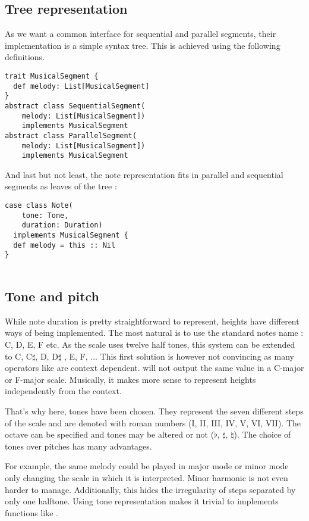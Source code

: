 \documentclass[twocolumn, 11pt]{article}
\begin{document}
\subsection{Tree representation}
As we want a common interface for sequential and parallel segments, their implementation is a simple syntax tree.
This is achieved using the following definitions.
\begin{lstlisting}
trait MusicalSegment {
  def melody: List[MusicalSegment]
}
abstract class SequentialSegment(
    melody: List[MusicalSegment])
    implements MusicalSegment
abstract class ParallelSegment(
    melody: List[MusicalSegment])
    implements MusicalSegment
\end{lstlisting}
And last but not least, the note representation fits in parallel and sequential segments as leaves of the tree :

\begin{lstlisting}
case class Note(
    tone: Tone,
    duration: Duration)
  implements MusicalSegment {
  def melody = this :: Nil
}


\end{lstlisting}

\subsection{Tone and pitch}

While note duration is pretty straightforward to represent, heights have different ways of being implemented.
The most natural is to use the standard notes name : C, D, E, F etc. As the scale uses twelve half tones, this system can be extended to C, C$\sharp$, D, D$\sharp$ , E, F, ... This first solution is however not convincing as many operators like  are context dependent.  will not output the same value in a C-major or F-major scale. Musically, it makes more sense to represent heights independently from the context.

That's why here, tones have been chosen. They represent the seven different steps of the scale and are denoted with roman numbers (I, II, III, IV, V, VI, VII). The octave can be specified and tones may be altered or not ($\flat$, $\sharp$, $\natural$).
The choice of tones over pitches has many advantages.

For example, the same melody could be played in major mode or minor mode only changing the scale in which it is interpreted. Minor harmonic is not even harder to manage. Additionally, this hides the irregularity of steps separated by only one halftone. Using tone representation makes it trivial to implements functions like .
\end{document}
